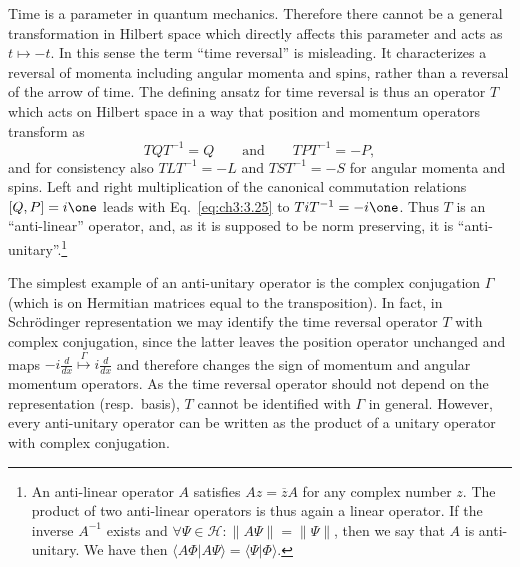 \documentclass[11pt,a4paper]{article}
\numberwithin{equation}{section}
\begin{document}
Time is a parameter in quantum mechanics. Therefore there cannot be a general transformation in Hilbert space which
directly affects this parameter and acts as $t\mapsto -t$. In this sense the term ``time reversal'' is misleading.
It characterizes a reversal of momenta including angular momenta and spins, rather than a reversal of the arrow of time.
The defining ansatz for time reversal is thus an operator $T$ which acts on Hilbert space in a way that position and
momentum operators transform as
\begin{equation}\label{eq:ch3:3.25}
    TQT^{-1}=Q
    \qquad\text{and}\qquad
    TPT^{-1}=-P,
\end{equation}
and for consistency also $TLT^{-1}=-L$ and $TST^{-1}=-S$ for angular momenta and spins. Left and right multiplication
of the canonical commutation relations $[Q,P]=i\one$ leads with Eq.~\eqref{eq:ch3:3.25} to $TiT^{-1}=-i\one$. Thus $T$
is an ``anti-linear'' operator, and, as it is supposed to be norm preserving, it is ``anti-unitary''.\footnote{An
    anti-linear operator $A$ satisfies $Az=\overline{z}A$ for any complex number $z$. The product of two anti-linear
    operators is thus again a linear operator. If the inverse $A^{-1}$ exists and $\forall\Psi\in \mathcal H:\|A\Psi\|=\|\Psi\|$,
    then we say that $A$ is anti-unitary. We have then $\langle A\Phi|A\Psi\rangle=\langle \Psi|\Phi\rangle$.}

The simplest example of an anti-unitary operator is the complex conjugation $\Gamma$ (which is on Hermitian matrices
equal to the transposition). In fact, in Schr\"odinger representation we may identify the time reversal operator $T$
with complex conjugation, since the latter leaves the position operator unchanged and maps
$-i\frac{d}{dx}\stackrel{\Gamma}{\mapsto} i\frac{d}{dx}$ and therefore changes the sign of momentum and angular
momentum operators. As the time reversal operator should not depend on the representation (resp.\ basis), $T$ cannot be
identified with $\Gamma$ in general. However, every anti-unitary operator can be written as the product of a unitary
operator with complex conjugation.
\end{document}
